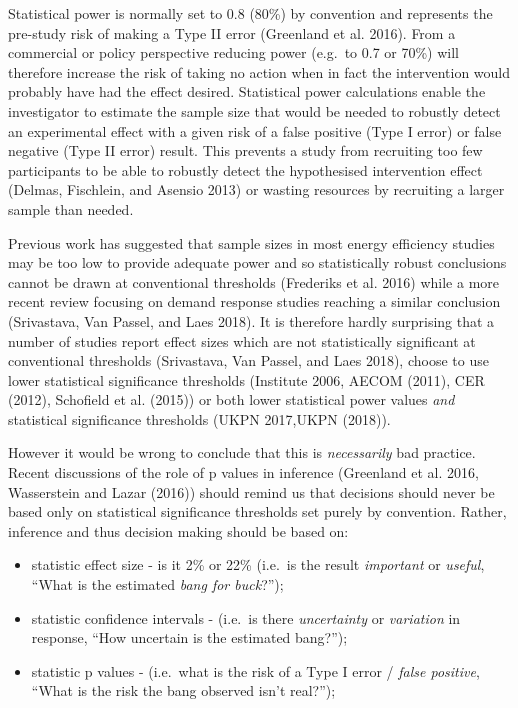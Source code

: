 \documentclass[]{article}
\providecommand{\tightlist}{%
  \setlength{\itemsep}{0pt}\setlength{\parskip}{0pt}}
\theoremstyle{definition}
\theoremstyle{definition}
\theoremstyle{definition}
\theoremstyle{remark}
\begin{document}
Statistical power is normally set to 0.8 (80\%) by convention and
represents the pre-study risk of making a Type II error (Greenland et
al. 2016). From a commercial or policy perspective reducing power
(e.g.~to 0.7 or 70\%) will therefore increase the risk of taking no
action when in fact the intervention would probably have had the effect
desired. Statistical power calculations enable the investigator to
estimate the sample size that would be needed to robustly detect an
experimental effect with a given risk of a false positive (Type I error)
or false negative (Type II error) result. This prevents a study from
recruiting too few participants to be able to robustly detect the
hypothesised intervention effect (Delmas, Fischlein, and Asensio 2013)
or wasting resources by recruiting a larger sample than needed.

Previous work has suggested that sample sizes in most energy efficiency
studies may be too low to provide adequate power and so statistically
robust conclusions cannot be drawn at conventional thresholds (Frederiks
et al. 2016) while a more recent review focusing on demand response
studies reaching a similar conclusion (Srivastava, Van Passel, and Laes
2018). It is therefore hardly surprising that a number of studies report
effect sizes which are not statistically significant at conventional
thresholds (Srivastava, Van Passel, and Laes 2018), choose to use lower
statistical significance thresholds (Institute 2006, AECOM (2011), CER
(2012), Schofield et al. (2015)) or both lower statistical power values
\emph{and} statistical significance thresholds (UKPN 2017,UKPN (2018)).

However it would be wrong to conclude that this is \emph{necessarily}
bad practice. Recent discussions of the role of p values in inference
(Greenland et al. 2016, Wasserstein and Lazar (2016)) should remind us
that decisions should never be based only on statistical significance
thresholds set purely by convention. Rather, inference and thus decision
making should be based on:

\begin{itemize}
\tightlist
\item
  statistic effect size - is it 2\% or 22\% (i.e.~is the result
  \emph{important} or \emph{useful}, ``What is the estimated \emph{bang
  for buck}?'');
\item
  statistic confidence intervals - (i.e.~is there \emph{uncertainty} or
  \emph{variation} in response, ``How uncertain is the estimated
  bang?'');
\item
  statistic p values - (i.e.~what is the risk of a Type I error /
  \emph{false positive}, ``What is the risk the bang observed isn't
  real?'');
\end{itemize}
\end{document}
